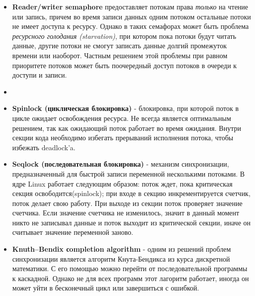 {\begin{itemize}
			\item\textbf{Reader/writer semaphore} предоставляет потокам права \textit{только} на чтение или запись, причем во время записи данных одним потоком остальные потоки не имеет доступа к ресурсу. Однако в таких семафорах может быть проблема \textit{ресурсного голодания (starvation)}, при котором пока потоки будут читать данные, другие потоки не смогут записать данные долгий промежуток времени или наоборот. Частным решением этой проблемы при равном приоритете потоков может быть поочередный доступ потоков в очереди к доступи и записи.
			\item{}
			\item\textbf{Spinlock (циклическая блокировка)} - блокировка, при которой поток в цикле ожидает освобождения ресурса. Не всегда является оптимальным решением, так как ожидающий поток работает во время ожидания. Внутри секции кода необходимо избегать прерываний исполнения потока, чтобы избежать deadlock'a.
			\item\textbf{Seqlock (последовательная блокировка)} - механизм синхронизации, предназначенный для быстрой записи переменной несколькими потоками. В ядре Linux работает следующим образом: поток ждет, пока критическая секция освободится(spinlock); при входе в секцию инкрементируется счетчик, поток делает свою работу. При выходе из секции поток проверяет значение счетчика. Если значение счетчика не изменилось, значит в данный момент никто не записывал данные и поток выходит из критической секции, иначе он считывает значение переменной заново.
			\item\textbf{Knuth–Bendix сompletion algorithm} - одним из решений проблем синхронизации является алгоритм Кнута-Бендикса из курса дискретной математики. С его помощью можно перейти от последовательной программы к каскадной. Однако не для всех программ этот лагоритм работает, иногда он может уйти в бесконечный цикл или завершиться с ошибкой.

\end{itemize}}
